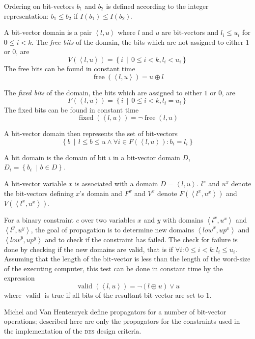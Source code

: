 \documentclass[a4paper,10pt,twoside,openright]{book}
\renewcommand{\sc}[1]{\textsc{\lowercase{#1}}}
\newcommand{\set}[1]{\left\{#1\right\}}
\newcommand{\suchthat}{\,\middle|\,}
\newcommand{\tuple}[1]{\left\langle #1\right\rangle}
\DeclareMathOperator{\fixed}{fixed}
\DeclareMathOperator{\free}{free}
\DeclareMathOperator{\valid}{valid}
\begin{document}
Ordering on bit-vectors $b_1$ and $b_2$ is defined according to the integer representation: $b_1 \leq b_2$ if $I(b_1) \leq I(b_2)$.

A bit-vector domain is a pair $\tuple{l,u}$ where $l$ and $u$ are bit-vectors and $l_i \leq u_i$ for $0 \leq i < k$. 
The \textit{free bits} of the domain, the bits which are not assigned to either $1$ or $0$, are \[V(\tuple{l,u}) = \set{i \suchthat 0 \leq i < k, l_i < u_i}\]
The free bits can be found in constant time \[\free(\tuple{l,u}) = u \oplus l\]

The \textit{fixed bits} of the domain, the bits which are assigned to either $1$ or $0$, are \[F(\tuple{l,u}) = \set{i \suchthat 0 \leq i < k, l_i = u_i}\]
The fixed bits can be found in constant time \[\fixed(\tuple{l,u}) = \lnot\free(l,u)\]

A bit-vector domain then represents the set of bit-vectors 
\[\set{b \suchthat l \leq b \leq u \land \forall i \in F(\tuple{l,u}) : b_i = l_i }\]

A bit domain is the domain of bit $i$ in a bit-vector domain $D$, $D_i = \set{b_i \suchthat b \in D}$.

A bit-vector variable $x$ is associated with a domain $D = \tuple{l,u}$. $l^x$ and $u^x$ denote the bit-vectors defining $x$'s domain and $F^x$ and $V^x$ denote $F(\tuple{l^x,u^x})$ and $V(\tuple{l^x,u^x})$. 

For a binary constraint $c$ over two variables $x$ and $y$ with domains $\tuple{l^x,u^x}$ and $\tuple{l^y,u^y}$, the goal of propagation is to determine new domains $\tuple{\mathit{low}^x,\mathit{up}^x}$ and $\tuple{\mathit{low}^y,\mathit{up}^y}$ and to check if the constraint has failed. 
The check for failure is done by checking if the new domains are valid, that is if $\forall i : 0 \leq i < k : l_i \leq u_i$. 
Assuming that the length of the bit-vector is less than the length of the word-size of the executing computer,
this test can be done in constant time by the expression \[\valid(\tuple{l,u}) = \lnot(l \oplus u) \lor u\]
where $\valid$ is true if all bits of the resultant bit-vector are set to $1$.

Michel and Van Hentenryck define propagators for 
a number of bit-vector operations;
described here are only the propagators for the constraints used in the implementation of the \sc{DES} design criteria.
\end{document}
